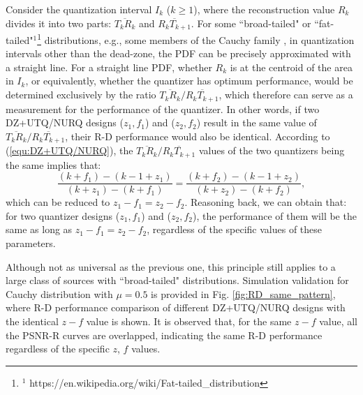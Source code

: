 \documentclass[smallabstract,smallcaptions]{dccpaper}
\begin{document}
Consider the quantization interval $I_k$ ($k \ge 1$), where the reconstruction value $R_k$ divides it into two parts: $\overline{T_k R_k}$ and $\overline{R_k T_{k+1}}$. For some ``broad-tailed" or ``fat-tailed"$^1$\footnote{$^1$ https://en.wikipedia.org/wiki/Fat-tailed\_distribution} distributions, e.g., some members of the Cauchy family \cite{Farvardin_TIT1984}, in quantization intervals other than the dead-zone, the PDF can be precisely approximated with a straight line. For a straight line PDF, whether $R_k$ is at the centroid of the area in $I_k$, or equivalently, whether the quantizer has optimum performance, would be determined exclusively by the ratio $\overline{T_k R_k} / \overline{R_k T_{k+1}}$, which therefore can serve as a measurement for the performance of the quantizer. In other words, if two DZ+UTQ/NURQ designs ($z_1, f_1$) and ($z_2, f_2$) result in the same value of $\overline{T_k R_k} / \overline{R_k T_{k+1}}$, their R-D performance would also be identical. According to (\ref{equ:DZ+UTQ/NURQ}), the $\overline{T_k R_k} / \overline{R_k T_{k+1}}$ values of the two quantizers being the same implies that:
\begin{equation}\label{equ:formula-ratio}
\frac{(k+f_1)-(k-1+z_1)}{(k+z_1)-(k+f_1)} = \frac{(k+f_2)-(k-1+z_2)}{(k+z_2)-(k+f_2)},
\end{equation}
which can be reduced to $z_1 - f_1 = z_2 - f_2$. Reasoning back, we can obtain that: for two quantizer designs ($z_1, f_1$) and ($z_2, f_2$), the performance of them will be the same as long as $z_1 - f_1 = z_2 - f_2$, regardless of the specific values of these parameters.

Although not as universal as the previous one, this principle still applies to a large class of sources with ``broad-tailed" distributions. Simulation validation for Cauchy distribution with $\mu = 0.5$ is provided in Fig. \ref{fig:RD_same_pattern}, where R-D performance comparison of different DZ+UTQ/NURQ designs with the identical $z-f$ value is shown. It is observed that, for the same $z-f$ value, all the PSNR-R curves are overlapped, indicating the same R-D performance regardless of the specific $z$, $f$ values.
\end{document}
